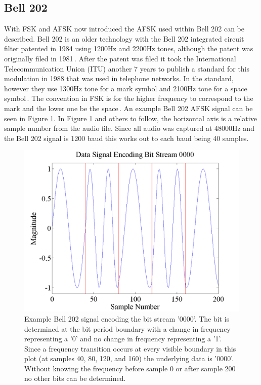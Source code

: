 \subsection{Bell 202}
With FSK and AFSK now introduced the AFSK used within Bell 202 can be described. Bell 202 is an older technology with the Bell 202 integrated circuit filter patented in 1984 using 1200Hz and 2200Hz tones, although the patent was originally filed in 1981\,\cite{stauffer1984fsk}. After the patent was filed it took the International Telecommunication Union (ITU) another 7 years to publish a standard for this modulation in 1988 that was used in telephone networks. In the standard, however they use 1300Hz tone for a mark symbol and 2100Hz tone for a space symbol\,\cite{ITUV23}. The convention in FSK is for the higher frequency to correspond to the mark and the lower one be the space\,\cite{Watson1980}. An example Bell 202 AFSK signal can be seen in Figure \ref{exampleBitStream}. In Figure \ref{exampleBitStream} and others to follow, the horizontal axis is a relative sample number from the audio file. Since all audio was captured at 48000Hz and the Bell 202 signal is 1200 baud this works out to each baud being 40 samples. 
\begin{figure}
  \centering
	\includegraphics[width=0.75\linewidth]{images/Datasignalencodingbitstream0000.png} 
	\caption{Example Bell 202 signal encoding the bit stream '0000'. The bit is determined at the bit period boundary with a change in frequency representing a '0' and no change in frequency representing a '1'. Since a frequency transition occurs at every visible boundary in this plot (at samples 40, 80, 120, and 160) the underlying data is '0000'. Without knowing the frequency before sample 0 or after sample 200 no other bits can be determined.}
	\label{exampleBitStream}
\end{figure}
